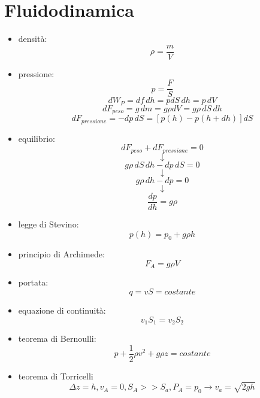 \documentclass[a4paper,12pt, oneside]{book}
\begin{document}
\section{Fluidodinamica}
\begin{itemize}
\item densità:
$$\rho=\frac{m}{V}$$
\item pressione:
$$p=\frac{F}{S}$$
$$dW_P=df\,dh=pdS\,dh=p\,dV$$
$$dF_{peso}=g\,dm=g\rho dV=g\rho \,dS\,dh$$
$$dF_{pressione}=-dp\,dS=[p(h)-p(h+dh)]dS$$
\item equilibrio:
$$dF_{peso}+dF_{pressione}=0$$
$$\downarrow$$
$$g\rho \,dS\,dh-dp\,dS=0$$
$$\downarrow$$
$$g\rho \,dh-dp=0$$
$$\downarrow$$
$$\frac{dp}{dh}=g\rho$$
\item legge di Stevino:
$$p(h)=p_0+g\rho h$$
\item principio di Archimede:
$$F_A=g\rho V$$
\item portata:
$$q=vS=costante$$
\item equazione di continuità:
$$v_1S_1=v_2S_2$$
\item teorema di Bernoulli:
$$p+\frac{1}{2}\rho v^2+g\rho z =costante$$
\item teorema di Torricelli
$$\Delta z= h, v_A=0, S_A>>S_a, P_A=p_0\to v_a=\sqrt{2gh}$$
\end{itemize}
\end{document}
